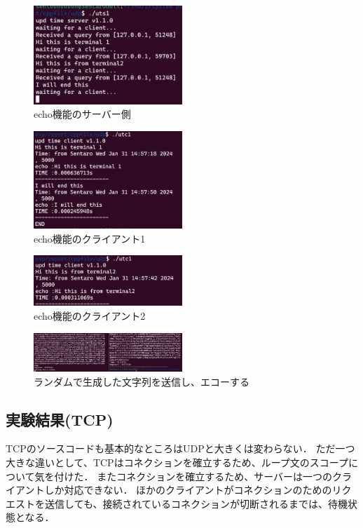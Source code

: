 \documentclass[fleqn, a4paper. 12pt]{ltjsarticle}
\begin{document}
    \begin{figure}[htbp]
      \includegraphics[width=0.5\textwidth]{images/udp_server_echo.png}
      \caption{echo機能のサーバー側}
      \label{fig:udpserver1}
    \end{figure}
    \begin{figure}[htbp]
      \includegraphics[width=0.5\textwidth]{images/udp_terminal1.png}
      \caption{echo機能のクライアント1}
      \label{fig:terminal1}
    \end{figure}
    \begin{figure}[htbp]
      \includegraphics[width=0.5\textwidth]{images/udp_terminal2.png}
      \caption{echo機能のクライアント2}
      \label{fig:terminal2}
    \end{figure}
    
    \begin{figure}[htbp]
      \includegraphics[width=0.5\textwidth]{images/udp_rand.png}
      \caption{ランダムで生成した文字列を送信し、エコーする}
      \label{fig:udp_rand}
    \end{figure}
    
    \newpage
    \subsection{実験結果(TCP)}
    TCPのソースコードも基本的なところはUDPと大きくは変わらない．
    ただ一つ大きな違いとして、TCPはコネクションを確立するため、ループ文のスコープについて気を付けた．
    またコネクションを確立するため、サーバーは一つのクライアントしか対応できない．
    ほかのクライアントがコネクションのためのリクエストを送信しても、接続されているコネクションが切断されるまでは、待機状態となる．
    
\end{document}
